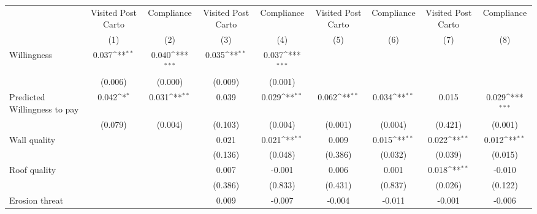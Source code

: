 {
\def\sym#1{\ifmmode^{#1}\else\(^{#1}\)\fi}
\begin{tabular}{l*{8}{c}}
\toprule
                &\multicolumn{1}{c}{Visited Post Carto}&\multicolumn{1}{c}{Compliance}&\multicolumn{1}{c}{Visited Post Carto}&\multicolumn{1}{c}{Compliance}&\multicolumn{1}{c}{Visited Post Carto}&\multicolumn{1}{c}{Compliance}&\multicolumn{1}{c}{Visited Post Carto}&\multicolumn{1}{c}{Compliance}\\
                &\multicolumn{1}{c}{(1)}         &\multicolumn{1}{c}{(2)}         &\multicolumn{1}{c}{(3)}         &\multicolumn{1}{c}{(4)}         &\multicolumn{1}{c}{(5)}         &\multicolumn{1}{c}{(6)}         &\multicolumn{1}{c}{(7)}         &\multicolumn{1}{c}{(8)}         \\
\midrule
Willingness     &    0.037\sym{**} &    0.040\sym{***}&    0.035\sym{**} &    0.037\sym{***}&                  &                  &                  &                  \\
                &  (0.006)         &  (0.000)         &  (0.009)         &  (0.001)         &                  &                  &                  &                  \\
Predicted Willingness to pay&    0.042\sym{*}  &    0.031\sym{**} &    0.039         &    0.029\sym{**} &    0.062\sym{**} &    0.034\sym{**} &    0.015         &    0.029\sym{***}\\
                &  (0.079)         &  (0.004)         &  (0.103)         &  (0.004)         &  (0.001)         &  (0.004)         &  (0.421)         &  (0.001)         \\
Wall quality    &                  &                  &    0.021         &    0.021\sym{**} &    0.009         &    0.015\sym{**} &    0.022\sym{**} &    0.012\sym{**} \\
                &                  &                  &  (0.136)         &  (0.048)         &  (0.386)         &  (0.032)         &  (0.039)         &  (0.015)         \\
Roof quality    &                  &                  &    0.007         &   -0.001         &    0.006         &    0.001         &    0.018\sym{**} &   -0.010         \\
                &                  &                  &  (0.386)         &  (0.833)         &  (0.431)         &  (0.837)         &  (0.026)         &  (0.122)         \\
Erosion threat  &                  &                  &    0.009         &   -0.007         &   -0.004         &   -0.011         &   -0.001         &   -0.006         \\

\end{tabular}}
